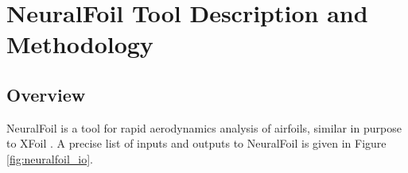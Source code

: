 \documentclass[journal]{new-aiaa}
\begin{document}
\section{NeuralFoil Tool Description and Methodology}
\label{sec:methodology}

\subsection{Overview}


NeuralFoil is a tool for rapid aerodynamics analysis of airfoils, similar in purpose to XFoil \cite{drelaXFOILAnalysisDesign1989}. A precise list of inputs and outputs to NeuralFoil is given in Figure \ref{fig:neuralfoil_io}.
\end{document}
